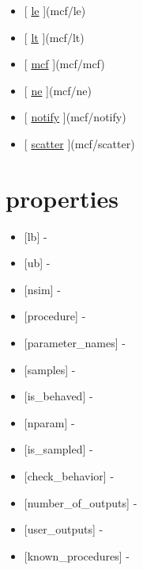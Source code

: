 \documentclass[letterpaper,10pt,english]{sphinxmanual}
\begin{document}
\begin{itemize}
\item {} 
{[} {\hyperref[classes/utils/@mcf/mcf:le]{le}} {]}(mcf/le)

\item {} 
{[} {\hyperref[classes/utils/@mcf/mcf:lt]{lt}} {]}(mcf/lt)

\item {} 
{[} {\hyperref[classes/utils/@mcf/mcf:mcf]{mcf}} {]}(mcf/mcf)

\item {} 
{[} {\hyperref[classes/utils/@mcf/mcf:ne]{ne}} {]}(mcf/ne)

\item {} 
{[} {\hyperref[classes/utils/@mcf/mcf:notify]{notify}} {]}(mcf/notify)

\item {} 
{[} {\hyperref[classes/utils/@mcf/mcf:scatter]{scatter}} {]}(mcf/scatter)

\end{itemize}


\section{properties}
\label{classes/utils/@mcf/mcf:properties}\begin{itemize}
\item {} 
{[}lb{]} -

\item {} 
{[}ub{]} -

\item {} 
{[}nsim{]} -

\item {} 
{[}procedure{]} -

\item {} 
{[}parameter\_names{]} -

\item {} 
{[}samples{]} -

\item {} 
{[}is\_behaved{]} -

\item {} 
{[}nparam{]} -

\item {} 
{[}is\_sampled{]} -

\item {} 
{[}check\_behavior{]} -

\item {} 
{[}number\_of\_outputs{]} -

\item {} 
{[}user\_outputs{]} -

\item {} 
{[}known\_procedures{]} -

\end{itemize}
\end{document}
